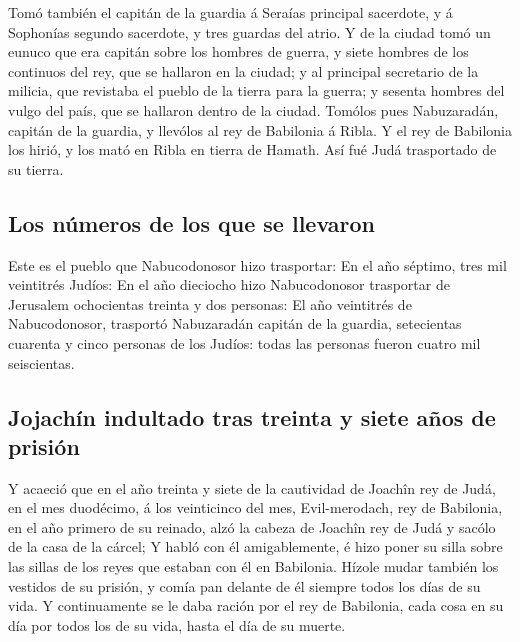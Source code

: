  Tomó también el capitán de la guardia á Seraías
principal sacerdote, y á Sophonías segundo sacerdote, y tres guardas del
atrio.  Y de la ciudad tomó un eunuco que era capitán
sobre los hombres de guerra, y siete hombres de los continuos del rey,
que se hallaron en la ciudad; y al principal secretario de la milicia,
que revistaba el pueblo de la tierra para la guerra; y sesenta hombres
del vulgo del país, que se hallaron dentro de la ciudad. 
Tomólos pues Nabuzaradán, capitán de la guardia, y llevólos al rey de
Babilonia á Ribla.  Y el rey de Babilonia los hirió, y
los mató en Ribla en tierra de Hamath. Así fué Judá trasportado de su
tierra.

\hypertarget{los-nuxfameros-de-los-que-se-llevaron}{%
\subsection{Los números de los que se
llevaron}\label{los-nuxfameros-de-los-que-se-llevaron}}

 Este es el pueblo que Nabucodonosor hizo trasportar: En
el año séptimo, tres mil veintitrés Judíos:  En el año
dieciocho hizo Nabucodonosor trasportar de Jerusalem ochocientas treinta
y dos personas:  El año veintitrés de Nabucodonosor,
trasportó Nabuzaradán capitán de la guardia, setecientas cuarenta y
cinco personas de los Judíos: todas las personas fueron cuatro mil
seiscientas.

\hypertarget{jojachuxedn-indultado-tras-treinta-y-siete-auxf1os-de-prisiuxf3n}{%
\subsection{Jojachín indultado tras treinta y siete años de
prisión}\label{jojachuxedn-indultado-tras-treinta-y-siete-auxf1os-de-prisiuxf3n}}

 Y acaeció que en el año treinta y siete de la cautividad
de Joachîn rey de Judá, en el mes duodécimo, á los veinticinco del mes,
Evil-merodach, rey de Babilonia, en el año primero de su reinado, alzó
la cabeza de Joachîn rey de Judá y sacólo de la casa de la cárcel;
 Y habló con él amigablemente, é hizo poner su silla
sobre las sillas de los reyes que estaban con él en Babilonia.
 Hízole mudar también los vestidos de su prisión, y comía
pan delante de él siempre todos los días de su vida.  Y
continuamente se le daba ración por el rey de Babilonia, cada cosa en su
día por todos los de su vida, hasta el día de su muerte.
